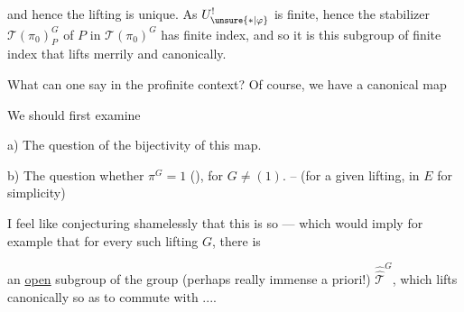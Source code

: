 and hence the lifting is unique. As
$U^{!}_{\unsure{*|\varphi}}$ is finite, hence the stabilizer
$\mathcal T(\pi_0)^G_P$ of $P$ in
$\mathcal T(\pi_0)^G$ has finite index,
and so it is this subgroup of finite index that lifts
merrily and canonically.

What can one say in the profinite context? Of course,
we have a canonical map

We should first examine

a) The question of the bijectivity of this map.

b) The question whether $\pi^G=1$ (),
for $G\ne(1)$. -- (for a given lifting,
in $E$ for simplicity)

I feel like conjecturing shamelessly
that this is so --- which would imply
for example that for every such lifting $G$, there is


an \uline{open} subgroup  of the group (perhaps really immense a priori!) $\widehat{\widehat{\mathcal T}}^{G}$, which lifts canonically so as to commute with ....

